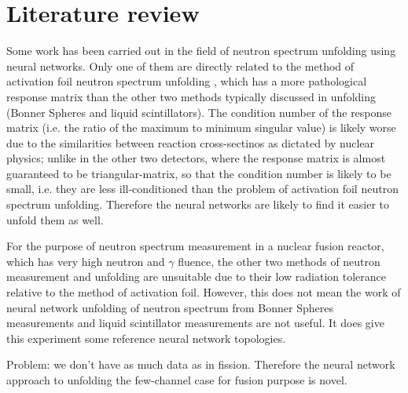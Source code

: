 \documentclass[a4paper, 12pt]{article}
\begin{document}
\section{Literature review}
Some work has been carried out in the field of neutron spectrum unfolding using neural networks. Only one of them are directly related to the method of activation foil neutron spectrum unfolding \cite{Accelerator-basedANNUnfolding}, which has a more pathological response matrix than the other two methods typically discussed in unfolding (Bonner Spheres and liquid scintillators). The condition number of the response matrix (i.e. the ratio of the maximum to minimum singular value\cite{MATLAB}) is likely worse due to the similarities between reaction cross-sectinos as dictated by nuclear physics; unlike in the other two detectors, where the response matrix is almost guaranteed to be triangular-matrix, so that the condition number is likely to be small, i.e. they are less ill-conditioned than the problem of activation foil neutron spectrum unfolding. Therefore the neural networks are likely to find it easier to unfold them as well.

For the purpose of neutron spectrum measurement in a nuclear fusion reactor, which has very high neutron and $\gamma$ fluence, the other two methods of neutron measurement and unfolding are unsuitable due to their low radiation tolerance relative to the method of activation foil. However, this does not mean the work of neural network unfolding of neutron spectrum from Bonner Spheres measurements
\cite{Rodrigues-UnfoldingCompuerCodeBasedOnANN} %
\cite{ANNDoseQuantitiesPrediction} %
\cite{ClaudiaC.BonnerSphereNNUnfolding} %
\cite{RDANNM} %
and liquid scintillator measurements
\cite{ANN-ModifiedLeastSquare} %
are not useful. It does give this experiment some reference neural network topologies.

\begin{tabular}
    \begin{table}
            
    \end{table}
\end{tabular}

Problem: we don't have as much data as in fission.
\cite{SVitishaGeneticAlgorithm}
\cite{ParticleSwamp_NE-213}
Therefore the neural network approach to unfolding the few-channel case for fusion purpose is novel.
\end{document}
